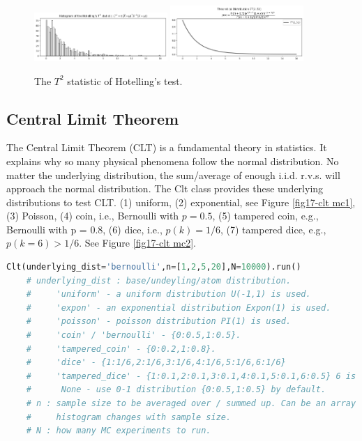 \documentclass[11pt, letterpaper]{article}
\begin{document}
\begin{figure}[htbp]
    \centering
    \vspace{-0.5em}
    \includegraphics[width=0.45\textwidth]{fig16-Hotelling T mc1.png}
    \includegraphics[width=0.45\textwidth]{fig16-Hotelling T mc2.png}
    \caption{The $T^2$ statistic of Hotelling's test.}
    \label{fig:Hotelling T mc}
\end{figure}

\subsection{Central Limit Theorem}
The Central Limit Theorem (CLT) is a fundamental theory in statistics. It explains why so many physical
phenomena follow the normal distribution. No matter the underlying distribution, the sum/average of enough
i.i.d. r.v.s. will approach the normal distribution. The Clt class provides these underlying distributions
to test CLT. (1) uniform, (2) exponential, see Figure \ref{fig17-clt mc1}, (3) Poisson, (4) coin, i.e., Bernoulli with
$p = 0.5$, (5) tampered coin, e.g., Bernoulli with p = 0.8, (6) dice, i.e., $p(k) = 1/6$, (7) tampered dice, e.g.,
$p(k=6) > 1/6$. See Figure \ref{fig17-clt mc2}.

\lstset{
    basicstyle=\scriptsize,
    xleftmargin=-1em,,aboveskip=0.5em,belowskip=0.5em
}
\begin{lstlisting}[language=python]
    Clt(underlying_dist='bernoulli',n=[1,2,5,20],N=10000).run()
    # underlying_dist : base/undeyling/atom distribution. 
    #     'uniform' - a uniform distribution U(-1,1) is used.
    #     'expon' - an exponential distribution Expon(1) is used.
    #     'poisson' - poisson distribution PI(1) is used.
    #     'coin' / 'bernoulli' - {0:0.5,1:0.5}.
    #     'tampered_coin' - {0:0.2,1:0.8}.
    #     'dice' - {1:1/6,2:1/6,3:1/6,4:1/6,5:1/6,6:1/6}
    #     'tampered_dice' - {1:0.1,2:0.1,3:0.1,4:0.1,5:0.1,6:0.5} 6 is more likely.
    #      None - use 0-1 distribution {0:0.5,1:0.5} by default.
    # n : sample size to be averaged over / summed up. Can be an array / list, user can check how the 
    #     histogram changes with sample size.
    # N : how many MC experiments to run.
    \end{lstlisting}
\end{document}
